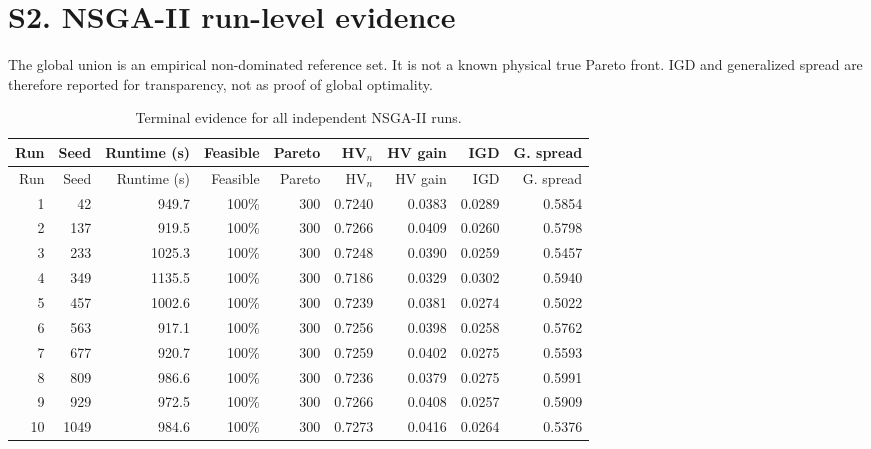 \documentclass[11pt]{article}
\begin{document}
\section*{S2. NSGA-II run-level evidence}
The global union is an empirical non-dominated reference set. It is not a known physical true Pareto front. IGD and generalized spread are therefore reported for transparency, not as proof of global optimality.
\begin{longtable}{rrrrrrrrr}
\caption{Terminal evidence for all independent NSGA-II runs.}\\
\toprule Run & Seed & Runtime (s) & Feasible & Pareto & HV$_n$ & HV gain & IGD & G. spread \\ \midrule
\endfirsthead
\toprule Run & Seed & Runtime (s) & Feasible & Pareto & HV$_n$ & HV gain & IGD & G. spread \\ \midrule
\endhead
1 & 42 & 949.7 & 100\% & 300 & 0.7240 & 0.0383 & 0.0289 & 0.5854 \\
2 & 137 & 919.5 & 100\% & 300 & 0.7266 & 0.0409 & 0.0260 & 0.5798 \\
3 & 233 & 1025.3 & 100\% & 300 & 0.7248 & 0.0390 & 0.0259 & 0.5457 \\
4 & 349 & 1135.5 & 100\% & 300 & 0.7186 & 0.0329 & 0.0302 & 0.5940 \\
5 & 457 & 1002.6 & 100\% & 300 & 0.7239 & 0.0381 & 0.0274 & 0.5022 \\
6 & 563 & 917.1 & 100\% & 300 & 0.7256 & 0.0398 & 0.0258 & 0.5762 \\
7 & 677 & 920.7 & 100\% & 300 & 0.7259 & 0.0402 & 0.0275 & 0.5593 \\
8 & 809 & 986.6 & 100\% & 300 & 0.7236 & 0.0379 & 0.0275 & 0.5991 \\
9 & 929 & 972.5 & 100\% & 300 & 0.7266 & 0.0408 & 0.0257 & 0.5909 \\
10 & 1049 & 984.6 & 100\% & 300 & 0.7273 & 0.0416 & 0.0264 & 0.5376 \\
\bottomrule
\end{longtable}
\end{document}
